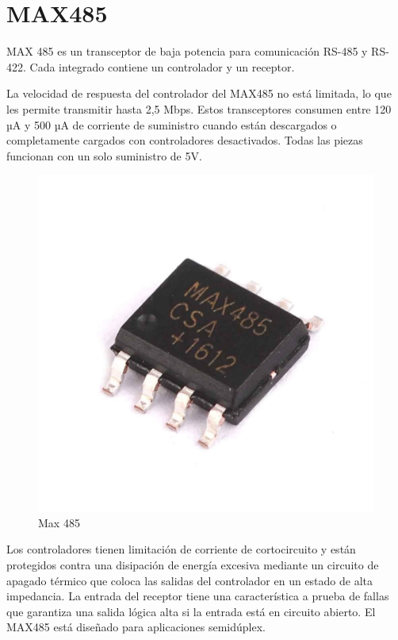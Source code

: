 \section{MAX485} \label{cap:max485}

MAX 485 es un transceptor de baja potencia para comunicación RS-485 y RS-422. Cada integrado contiene un controlador y un receptor.\par 
La velocidad de respuesta del controlador del MAX485 no está limitada, lo que les permite transmitir hasta 2,5 Mbps. Estos transceptores
consumen entre 120 µA y 500 µA de corriente de suministro cuando están descargados o completamente cargados con controladores desactivados.
Todas las piezas funcionan con un solo suministro de 5V. 

\begin{figure}[htb]
	\centering
	\includegraphics[scale=0.5]{images/max485.jpg}
    \caption{Max 485}
	\label{fig:max485}
\end{figure}

Los controladores tienen limitación de corriente de cortocircuito y están protegidos
contra una disipación de energía excesiva mediante un circuito de apagado térmico que coloca las salidas del controlador en un estado de alta 
impedancia. La entrada del receptor tiene una característica a prueba de fallas que garantiza una salida lógica alta si la entrada está en 
circuito abierto. El MAX485 está diseñado para aplicaciones semidúplex.

